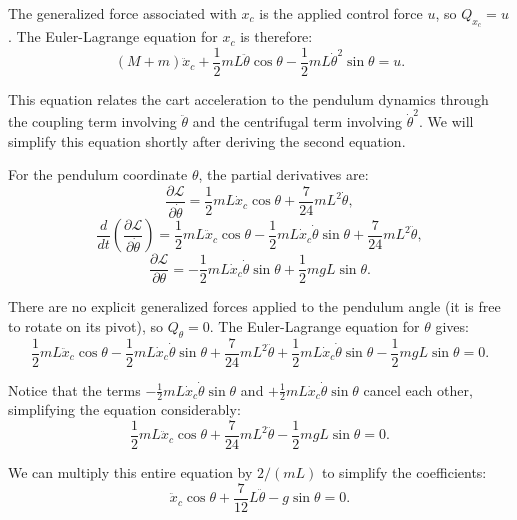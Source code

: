 The generalized force associated with $x_c$ is the applied control force $u$, so $Q_{x_c} = u$. The Euler-Lagrange equation for $x_c$ is therefore:
\begin{equation}
(M + m)\ddot{x}_c + \frac{1}{2}mL\ddot{\theta}\cos\theta - \frac{1}{2}mL\dot{\theta}^2\sin\theta = u.
\end{equation}

This equation relates the cart acceleration to the pendulum dynamics through the coupling term involving $\ddot{\theta}$ and the centrifugal term involving $\dot{\theta}^2$. We will simplify this equation shortly after deriving the second equation.

For the pendulum coordinate $\theta$, the partial derivatives are:
\begin{equation}
\frac{\partial \mathcal{L}}{\partial \dot{\theta}} = \frac{1}{2}mL\dot{x}_c\cos\theta + \frac{7}{24}mL^2\dot{\theta},
\end{equation}
\begin{equation}
\frac{d}{dt}\left(\frac{\partial \mathcal{L}}{\partial \dot{\theta}}\right) = \frac{1}{2}mL\ddot{x}_c\cos\theta - \frac{1}{2}mL\dot{x}_c\dot{\theta}\sin\theta + \frac{7}{24}mL^2\ddot{\theta},
\end{equation}
\begin{equation}
\frac{\partial \mathcal{L}}{\partial \theta} = -\frac{1}{2}mL\dot{x}_c\dot{\theta}\sin\theta + \frac{1}{2}mgL\sin\theta.
\end{equation}

There are no explicit generalized forces applied to the pendulum angle (it is free to rotate on its pivot), so $Q_\theta = 0$. The Euler-Lagrange equation for $\theta$ gives:
\begin{equation}
\frac{1}{2}mL\ddot{x}_c\cos\theta - \frac{1}{2}mL\dot{x}_c\dot{\theta}\sin\theta + \frac{7}{24}mL^2\ddot{\theta} + \frac{1}{2}mL\dot{x}_c\dot{\theta}\sin\theta - \frac{1}{2}mgL\sin\theta = 0.
\end{equation}

Notice that the terms $-\frac{1}{2}mL\dot{x}_c\dot{\theta}\sin\theta$ and $+\frac{1}{2}mL\dot{x}_c\dot{\theta}\sin\theta$ cancel each other, simplifying the equation considerably:
\begin{equation}
\frac{1}{2}mL\ddot{x}_c\cos\theta + \frac{7}{24}mL^2\ddot{\theta} - \frac{1}{2}mgL\sin\theta = 0.
\end{equation}

We can multiply this entire equation by $2/(mL)$ to simplify the coefficients:
\begin{equation}
\ddot{x}_c\cos\theta + \frac{7}{12}L\ddot{\theta} - g\sin\theta = 0.
\end{equation}

